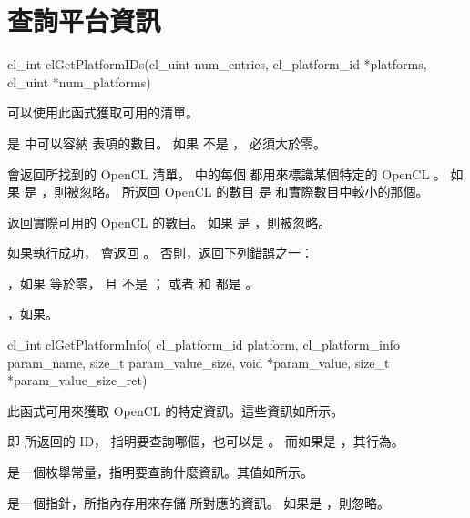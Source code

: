 \section{查詢平台資訊}


\startCLFUNC
cl_int clGetPlatformIDs(cl_uint num_entries,
			cl_platform_id *platforms,
			cl_uint *num_platforms)
\stopCLFUNC

可以使用此函式獲取可用的清單。

 是  中可以容納  表項的數目。
如果  不是 ，  必須大於零。

 會返回所找到的 OpenCL  清單。
 中的每個 
都用來標識某個特定的 OpenCL 。
如果  是 ，則被忽略。
所返回 OpenCL  的數目 是  和實際數目中較小的那個。

 返回實際可用的 OpenCL  的數目。
如果  是 ，則被忽略。

如果執行成功， 會返回 。
否則，返回下列錯誤之一：
\startigBase
\item {}，如果  等於零，
且  不是 ；
或者  和  都是 。

\item {}，如果\schostfailres。
\stopigBase


\startCLFUNC
cl_int clGetPlatformInfo(
		cl_platform_id platform,
		cl_platform_info param_name,
		size_t param_value_size,
		void *param_value,
		size_t *param_value_size_ret)
\stopCLFUNC

此函式可用來獲取 OpenCL 的特定資訊。這些資訊如所示。

 即  所返回的 ID，
指明要查詢哪個，也可以是 。
而如果是 ，其行為。

 是一個枚舉常量，指明要查詢什麼資訊。其值如所示。

 是一個指針，所指內存用來存儲  所對應的資訊。
如果是 ，則忽略。

